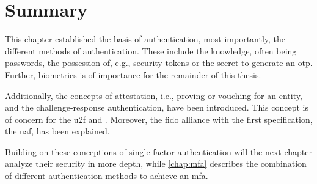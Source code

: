 \newpage
\section{Summary}

This chapter established the basis of authentication, most importantly, the different methods of authentication. These include the knowledge, often being passwords, the possession of, e.g., security tokens or the secret to generate an \gls{otp}. Further, biometrics is of importance for the remainder of this thesis.

Additionally, the concepts of attestation, i.e., proving or vouching for an entity, and the challenge-response authentication, have been introduced. This concept is of concern for the \gls{u2f} and \wa. Moreover, the \gls{fido} alliance with the first specification, the \gls{uaf}, has been explained.

Building on these conceptions of single-factor authentication will the next chapter analyze their security in more depth, while \autoref{chap:mfa} describes the combination of different authentication methods to achieve an \gls{mfa}.